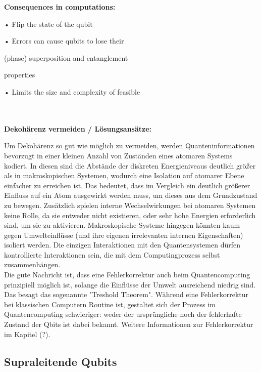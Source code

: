 \textbf{Consequences in computations:} 

• Flip the state of the qubit 

• Errors can cause qubits to lose their 

(phase) superposition and entanglement 

properties 

• Limits the size and complexity of feasible 

\\


\cite{nielsen_michael_a_and_isaac_l_chuang_quantum_2010}\\

 
\textbf{Dekohärenz vermeiden / Lösungsansätze: }

Um Dekohärenz so gut wie möglich zu vermeiden, werden Quanteninformationen bevorzugt in einer kleinen Anzahl von Zuständen eines atomaren Systems kodiert. In diesen sind die Abstände der diskreten Energieniveaus deutlich größer als in makroskopischen Systemen, wodurch eine  Isolation auf atomarer Ebene einfacher zu erreichen ist. Das bedeutet, dass im Vergleich ein deutlich größerer Einfluss auf ein Atom ausgewirkt werden muss, um dieses aus dem Grundzustand zu bewegen. Zusätzlich spielen interne Wechselwirkungen bei atomaren Systemen keine Rolle, da sie entweder nicht existieren, oder sehr hohe Energien erforderlich sind, um sie zu aktivieren.
Makroskopische Systeme hingegen könnten kaum gegen Umwelteinflüsse (und ihre eigenen irrelevanten internen Eigenschaften) isoliert werden. Die einzigen Interaktionen mit den Quantensystemen dürfen kontrollierte Interaktionen sein, die mit dem Computingprozess selbst zusammenhängen. \\

Die gute Nachricht ist, dass eine Fehlerkorrektur auch beim Quantencomputing prinzipiell möglich ist, solange die Einflüsse der Umwelt ausreichend niedrig sind. Das besagt das sogenannte "Treshold Theorem". Während eine Fehlerkorrektur bei klassischen Computern Routine ist, gestaltet sich der Prozess im Quantencomputing schwieriger: weder der ursprüngliche noch der fehlerhafte Zustand der Qbits ist dabei bekannt. 
Weitere Informationen zur Fehlerkorrektur im Kapitel (?). \\
 

 \cite{mermin_quantum_2012}
\subsection{Supraleitende Qubits }

